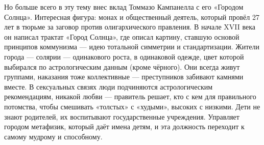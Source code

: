 
Но больше всего в эту тему внес вклад Томмазо Кампанелла с его «Городом Солнца». Интересная фигура: монах и общественный деятель, который провёл 27 лет в тюрьме за заговор против олигархического правления. В начале XVII века он написал трактат «Город Солнца», где описал картину, ставшую основой принципов коммунизма --- идею тотальной симметрии и стандартизации.
Жители города --- солярии --- одинакового роста, в одинаковой одежде, цвет которой выбирался по астрологическим данным (кроме чёрного). Они всегда живут группами, наказания тоже коллективные --- преступников забивают камнями вместе. В сексуальных связях люди подчиняются астрологическим рекомендациям, никакой любви --- правитель решает, кто с кем для правильного потомства, чтобы смешивать «толстых» с «худыми», высоких с низкими. Дети не знают родителей, их воспитывают государственные учреждения. Управляет городом метафизик, который даёт имена детям, и эта должность переходит к самому мудрому и способному.